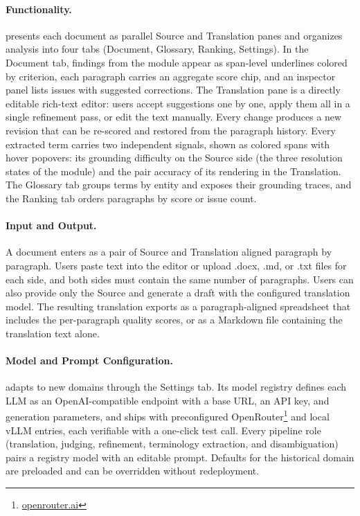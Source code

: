 \paragraph{Functionality.}
\systemname{} presents each document as parallel Source and Translation panes
and organizes analysis into four tabs (Document, Glossary, Ranking, Settings).
In the Document tab, findings from the \moduleEvaluation{} module appear as
span-level underlines colored by criterion, each paragraph carries an
aggregate score chip, and an inspector panel lists issues with suggested
corrections. The Translation pane is a directly editable rich-text editor:
users accept suggestions one by one, apply them all in a single refinement
pass, or edit the text manually. Every change produces a new revision that
can be re-scored and restored from the paragraph history. Every extracted
term carries two independent signals, shown as colored spans with hover
popovers: its grounding difficulty on the Source side (the three resolution
states of the \moduleTerminology{} module) and the pair accuracy of its
rendering in the Translation. The Glossary tab groups terms by entity and
exposes their grounding traces, and the Ranking tab orders paragraphs by
score or issue count.

\paragraph{Input and Output.}
A document enters \systemname{} as a pair of Source and Translation aligned
paragraph by paragraph. Users paste text into the editor or upload .docx,
.md, or .txt files for each side, and both sides must contain the same
number of paragraphs. Users can also provide only the Source and generate a
draft with the configured translation model. The resulting translation
exports as a paragraph-aligned spreadsheet that includes the per-paragraph
quality scores, or as a Markdown file containing the translation text
alone.

\paragraph{Model and Prompt Configuration.}
\systemname{} adapts to new domains through the Settings tab. Its model
registry defines each LLM as an OpenAI-compatible endpoint with a base URL,
an API key, and generation parameters, and ships with preconfigured
OpenRouter\footnote{\href{https://openrouter.ai}{openrouter.ai}} and local
vLLM entries, each verifiable with a one-click test call. Every pipeline
role (translation, judging, refinement, terminology extraction, and
disambiguation) pairs a registry model with an editable prompt. Defaults
for the historical domain are preloaded and can be overridden without
redeployment.

